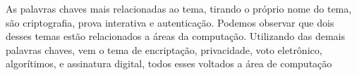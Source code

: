 As palavras chaves mais relacionadas ao tema, tirando o próprio nome do tema, são criptografia, prova interativa e autenticação.
Podemos observar que dois desses temas estão relacionados a áreas da computação. Utilizando das demais palavras chaves, vem o tema de encriptação, privacidade, voto eletrônico, algorítimos, e assinatura digital, todos esses voltados a área de computação

